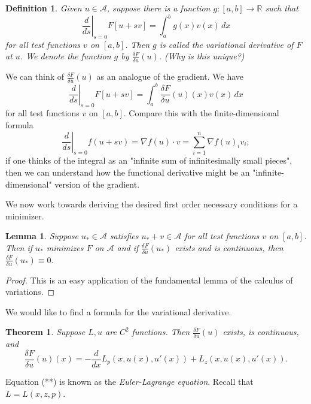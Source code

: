 \documentclass[11pt]{book}
\newcommand{\R}{\mathbb{R}}
\newtheorem{definition}{Definition}[subsection]
\newtheorem{theorem}{Theorem}[subsection]
\newtheorem{lemma}{Lemma}[subsection]
\begin{document}
\begin{definition}
Given $u \in \mathcal{A}$, suppose there is a function $g : [a,b] \to \R$ such that
\[
\left. \frac{d}{ds} \right|_{s = 0} F[u + sv] = \int_a^b g(x) v(x) \, dx
\]
for all test functions $v$ on $[a,b]$. Then $g$ is called the variational derivative of $F$ at $u$. We denote the function $g$ by $\frac{\delta F}{\delta u}(u)$. (Why is this unique?)
\end{definition}

We can think of $\frac{\delta F}{\delta u}(u)$ as an analogue of the gradient. We have
\[
\left. \frac{d}{ds} \right|_{s = 0} F[u + sv] = \int_a^b \frac{\delta F}{\delta u}(u)(x) v(x) \, dx
\]
for all test functions $v$ on $[a,b]$. Compare this with the finite-dimensional formula
\[
\left. \frac{d}{ds} \right|_{s=0} f(u + sv) = \nabla f(u) \cdot v = \sum_{i=1}^n \nabla f(u)_i v_i;
\]
if one thinks of the integral as an "infinite sum of infinitesimally small pieces", then we can understand how the functional derivative might be an "infinite-dimensional" version of the gradient.

We now work towards deriving the desired first order necessary conditions for a minimizer.

\begin{lemma}
Suppose $u_* \in \mathcal{A}$ satisfies $u_* + v \in \mathcal{A}$ for all test functions $v$ on $[a,b]$. Then if $u_*$ minimizes $F$ on $\mathcal{A}$ and if $\frac{\delta F}{\delta u}(u_*)$ exists and is continuous, then $\frac{\delta F}{\delta u}(u_*) \equiv 0$.
\end{lemma}
\begin{proof}
This is an easy application of the fundamental lemma of the calculus of variations.
\end{proof}

We would like to find a formula for the variational derivative.

\begin{theorem}
Suppose $L,u$ are $C^2$ functions. Then $\frac{\delta F}{\delta u}(u)$ exists, is continuous, and
\[
\tag{**}
\frac{\delta F}{\delta u}(u)(x) = -\frac{d}{dx} L_p(x,u(x), u'(x)) + L_z(x,u(x),u'(x)).
\]
\end{theorem}

Equation (**) is known as the \emph{Euler-Lagrange equation}. Recall that $L = L(x,z,p)$.
\end{document}

